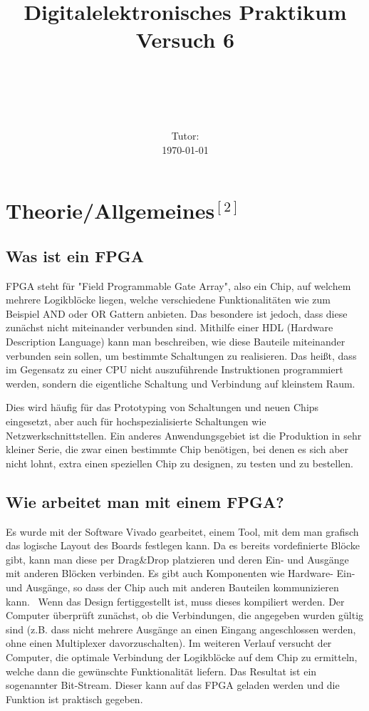 \documentclass[11pt, a4paper]{article}
\title{\textbf{Digitalelektronisches Praktikum\\ Versuch 6}}
\author{\ATutantName \\ \emph{\ATutantEmail} \and \BTutantName\\ \emph{\BTutantEmail}}
\date{\Gruppennummer \\[3ex] Tutor: \Tutorname \\[3ex] \today}
\begin{document}
\clearpage
\maketitle
\thispagestyle{empty}
\newpage

\section*{Theorie/Allgemeines$^{[2]}$}
\subsection*{Was ist ein FPGA}
FPGA steht für "Field Programmable Gate Array", also ein Chip, auf welchem mehrere Logikblöcke liegen, welche verschiedene Funktionalitäten wie zum Beispiel AND oder OR Gattern anbieten. Das besondere ist jedoch, dass diese zunächst nicht miteinander verbunden sind. Mithilfe einer HDL (Hardware Description Language) kann man beschreiben, wie diese Bauteile miteinander verbunden sein sollen, um bestimmte Schaltungen zu realisieren. Das heißt, dass im Gegensatz zu einer CPU nicht auszuführende Instruktionen programmiert werden, sondern die eigentliche Schaltung und Verbindung auf kleinstem Raum.

Dies wird häufig für das Prototyping von Schaltungen und neuen Chips eingesetzt, aber auch für hochspezialisierte Schaltungen wie Netzwerkschnittstellen. Ein anderes Anwendungsgebiet ist die Produktion in sehr kleiner Serie, die zwar einen bestimmte Chip benötigen, bei denen es sich aber nicht lohnt, extra einen speziellen Chip zu designen, zu testen und zu bestellen.

\subsection*{Wie arbeitet man mit einem FPGA?}
Es wurde mit der Software Vivado gearbeitet, einem Tool, mit dem man grafisch das logische Layout des Boards festlegen kann. Da es bereits vordefinierte Blöcke gibt, kann man diese per Drag\&Drop platzieren und deren Ein- und Ausgänge mit anderen Blöcken verbinden. Es gibt auch Komponenten wie Hardware- Ein- und Ausgänge, so dass der Chip auch mit anderen Bauteilen kommunizieren kann.
\
Wenn das Design fertiggestellt ist, muss dieses kompiliert werden. Der Computer überprüft zunächst, ob die Verbindungen, die angegeben wurden gültig sind (z.B. dass nicht mehrere Ausgänge an einen Eingang angeschlossen werden, ohne einen Multiplexer davorzuschalten). Im weiteren Verlauf versucht der Computer, die optimale Verbindung der Logikblöcke auf dem Chip zu ermitteln, welche dann die gewünschte Funktionalität liefern. Das Resultat ist ein sogenannter Bit-Stream. Dieser kann auf das FPGA geladen werden und die Funktion ist praktisch gegeben.
\end{document}
